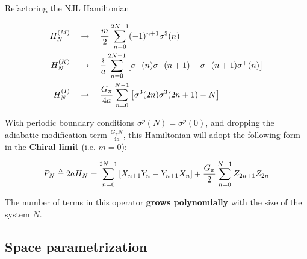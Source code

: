 \documentclass[9pt, aspectratio=169]{beamer}
\begin{document}
\begin{frame}{Refactoring the NJL Hamiltonian}

	\vspace{-1em}

	\begin{align*}
	  H_{N}^{(M)} &\quad \rightarrow \quad
	    \frac{m}{2} \sum_{n=0}^{2N-1} (-1)^{n+1}\sigma^{3}(n) \\
	  H_{N}^{(K)} &\quad \rightarrow \quad
	    \frac{i}{a} \sum_{n=0}^{2N-1}
	    \qty[\sigma^{-}(n)\sigma^{+}(n+1) - \sigma^{-}(n+1)\sigma^{+}(n)] \\
	  H_{N}^{(I)} &\quad \rightarrow \quad
	    \frac{G_{\pi}}{4a} \sum_{n=0}^{N-1} \qty[\sigma^{3}(2n)\sigma^{3}(2n+1) - N]
	\end{align*}

	\pause

	With periodic boundary conditions $\sigma^{p}(N)=\sigma^{p}(0)$, and dropping the adiabatic modification term $\frac{G_{\pi}N}{4a}$, this Hamiltonian will adopt the following form in the \textbf{Chiral limit} (i.e. $m=0$):

	\begin{gather*} \label{eq:NJL1-refactored-hamiltonian}
	  P_{N} \triangleq 2aH_{N} =
	    \sum_{n=0}^{2N-1} \qty[X_{n+1} Y_{n} - Y_{n+1} X_{n}] +
	      \frac{G_{\pi}}{2} \sum_{n=0}^{N-1} Z_{2n+1} Z_{2n}
	\end{gather*}

	The number of terms in this operator \textbf{grows polynomially} with the size of the system $N$.

\end{frame}



\subsection{Space parametrization}
\end{document}

